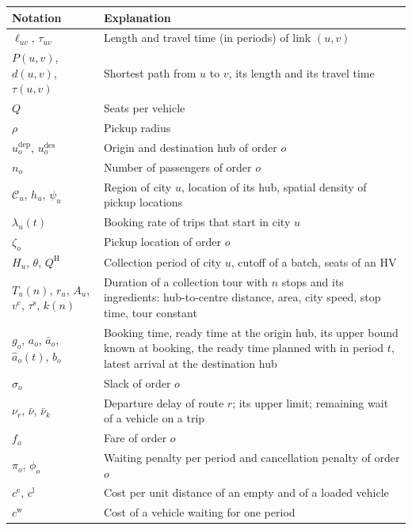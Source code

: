 \documentclass[12pt]{article}
\theoremstyle{plain}
\theoremstyle{definition}
\newcommand{\dep}{u^{\mathrm{dep}}}
\newcommand{\des}{u^{\mathrm{des}}}
\begin{document}
\begin{table}[h]
    \centering
    \begin{tabular}{l p{}}
        \toprule
        Notation & Explanation \\
        \midrule
        $\ell_{uv}$, $\tau_{uv}$ & Length and travel time (in periods) of link $(u,v)$\\
        $P(u,v)$, $d(u,v)$, $\tau(u,v)$ & Shortest path from $u$ to $v$, its length and its travel time\\
        $Q$ & Seats per vehicle\\
        $\rho$ & Pickup radius\\
        $\dep_o$, $\des_o$ & Origin and destination hub of order $o$\\
        $n_o$ & Number of passengers of order $o$\\
        $\mathcal{C}_u$, $h_u$, $\psi_u$ & Region of city $u$, location of its hub, spatial density of pickup locations\\
        $\lambda_u(t)$ & Booking rate of trips that start in city $u$\\
        $\zeta_o$ & Pickup location of order $o$\\
        $H_u$, $\theta$, $Q^{\mathrm{H}}$ & Collection period of city $u$, cutoff of a batch, seats of an HV\\
        $T_u(n)$, $r_u$, $A_u$, $v^{\mathrm{c}}$, $\tau^{\mathrm{s}}$, $k(n)$ & Duration of a collection tour with $n$ stops and its ingredients: hub-to-centre distance, area, city speed, stop time, tour constant\\
        $g_o$, $a_o$, $\bar a_o$, $\hat a_o(t)$, $b_o$ & Booking time, ready time at the origin hub, its upper bound known at booking, the ready time planned with in period $t$, latest arrival at the destination hub\\
        $\sigma_o$ & Slack of order $o$\\
        $\nu_r$, $\bar\nu$, $\bar\nu_k$ & Departure delay of route $r$; its upper limit; remaining wait of a vehicle on a trip\\
        $f_o$ & Fare of order $o$\\
        $\pi_o$, $\phi_o$ & Waiting penalty per period and cancellation penalty of order $o$\\
        $c^{\mathrm{e}}$, $c^{\mathrm{l}}$ & Cost per unit distance of an empty and of a loaded vehicle\\
        $c^{\mathrm{w}}$ & Cost of a vehicle waiting for one period\\

\end{tabular}
\end{table}
\end{document}
